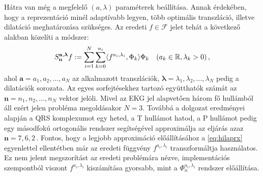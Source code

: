 \documentclass[oneside,titlepage,12pt,a4paper]{report}
\begin{document}
Hátra van még a megfelelő $(a,\lambda)$ paraméterek beállítása. Annak érdekében, hogy a reprezentáció minél adaptívabb legyen, több  optimális transzláció, illetve dilatáció meghatározása szükséges. Az eredeti $f\in\mathcal{F}$ jelet tehát a következő alakban közelíti a módszer:
\begin{equation*}
	S_{\mathbf{n}}^{\mathbf{a},\boldsymbol{\lambda}}f:=\sum_{i=1}^N\sum_{k=0}^{n_i} \langle f^{a_i,\lambda_i},\Phi_{k}\rangle\Phi_{k} \quad
	(a_k \in \Bbb R,\lambda_k>0)\,,
\end{equation*}
ahol $\mathbf{a}=a_1, a_2, \ldots, a_N$ az alkalmazott transzlációk, $\boldsymbol{\lambda}=\lambda_1, \lambda_2, \ldots, \lambda_N$ pedig a dilatációk sorozata. Az egyes sorfejtésekhez tartozó együtthatók számát az $\mathbf{n}=n_1, n_2, \ldots, n_N$ vektor jelöli. Mivel az EKG jel alapvetően három fő hullámból áll ezért jelen probléma megoldásakor $N=3.$ Továbbá a \cite{origCikk} dolgozat eredményei alapján
a QRS komplexumot egy heted, a T hullámot hatod, a P hullámot pedig egy másodfokú ortogonális rendszer segítségével approximálja az eljárás azaz $\mathbf{n}=7,6,2\,.$ Fontos, hogy a legjobb approximáció előállításához a \eqref{eq:hilaprx} egyenlettel ellentétben már az eredeti függvény $f^{a_i,\lambda_i}$ transzformáltja használatos. Ez nem jelent megszorítást az eredeti problémára nézve, implementációs szempontból viszont $f^{a_i,\lambda_i}$ kiszámítása gyorsabb, mint a $\Phi_n^{a_i,\lambda_i}$ rendszer előállítása.
\end{document}
